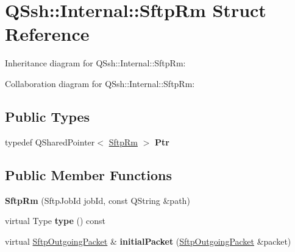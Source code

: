 \hypertarget{struct_q_ssh_1_1_internal_1_1_sftp_rm}{}\section{Q\+Ssh\+:\+:Internal\+:\+:Sftp\+Rm Struct Reference}
\label{struct_q_ssh_1_1_internal_1_1_sftp_rm}


Inheritance diagram for Q\+Ssh\+:\+:Internal\+:\+:Sftp\+Rm\+:


Collaboration diagram for Q\+Ssh\+:\+:Internal\+:\+:Sftp\+Rm\+:
\subsection*{Public Types}
\begin{DoxyCompactItemize}
\item 
\mbox{\label{struct_q_ssh_1_1_internal_1_1_sftp_rm_a8df882b720daf255181fd6995d91162c}} 
typedef Q\+Shared\+Pointer$<$ \mbox{\hyperlink{struct_q_ssh_1_1_internal_1_1_sftp_rm}{Sftp\+Rm}} $>$ {\bfseries Ptr}
\end{DoxyCompactItemize}
\subsection*{Public Member Functions}
\begin{DoxyCompactItemize}
\item 
\mbox{\label{struct_q_ssh_1_1_internal_1_1_sftp_rm_a0842b839ff32223cc620bb21d926b22d}} 
{\bfseries Sftp\+Rm} (Sftp\+Job\+Id job\+Id, const Q\+String \&path)
\item 
\mbox{\label{struct_q_ssh_1_1_internal_1_1_sftp_rm_a6ad26591eb6f960de7cf621097837b98}} 
virtual Type {\bfseries type} () const
\item 
\mbox{\label{struct_q_ssh_1_1_internal_1_1_sftp_rm_aafd8ab111ce92200b1bde8439451c6b1}} 
virtual \mbox{\hyperlink{class_q_ssh_1_1_internal_1_1_sftp_outgoing_packet}{Sftp\+Outgoing\+Packet}} \& {\bfseries initial\+Packet} (\mbox{\hyperlink{class_q_ssh_1_1_internal_1_1_sftp_outgoing_packet}{Sftp\+Outgoing\+Packet}} \&packet)
\end{DoxyCompactItemize}
